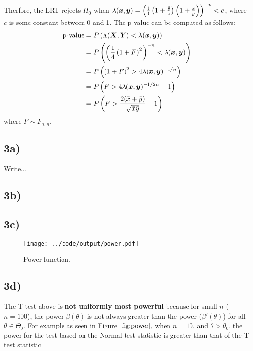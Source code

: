 \documentclass[11pt]{article}
\def\beginmyfig{\begin{figure}[H]\center} %
\def\endmyfig{\end{figure}}
\newcommand{\p}[1]{\left(#1\right)}
\begin{document}
Therfore, the LRT rejects $H_0$ when $\lambda(\bm x, \bm y) = \p{\frac{1}{4}\p{1+\frac{\ybar}{\xbar}}\p{1+\frac{\xbar}{\ybar}}}^{-n} < c$, where $c$ is some constant between 0 and 1. The p-value can be computed as follows:
\[
\begin{aligned}
  \text{p-value} &= P\p{\Lambda(\bm X,\bm Y) < \lambda(\bm x,\bm y)}\\
                 &= P\p{ \p{\frac{1}{4}\p{1+F}^2}^{-n}< \lambda(\bm x,\bm y)}\\
                 &= P\p{ \p{1+F}^2 > 4\lambda(\bm x,\bm y)^{-1/n}}\\
                 &= P\p{ F > 4\lambda(\bm x,\bm y)^{-1/2n}-1}\\
                 &= P\p{ F > \frac{2(\xbar+\ybar)}{\sqrt{\xbar\ybar}}-1}\\
\end{aligned}
\]
where $F\sim F_{n,n}$.




\subsection*{3a)}
Write...
\subsection*{3b)}
\subsection*{3c)}
\beginmyfig
  \texttt{[image: ../code/output/power.pdf]}
  \caption{\small Power function.}
  \label{fig:power}
\endmyfig
\subsection*{3d)}
The T test above is \textbf{not uniformly most powerful} because for small $n$ ($n=100$), the power $\beta(\theta)$ is not always greater than the power ($\beta'(\theta)$) for all $\theta \in \Theta_0$. For example as seen in Figure $\ref{fig:power}$, when $n=10$, and $\theta > \theta_0$, the power for the test based on the Normal test statistic is greater than that of the T test statistic.
\end{document}

